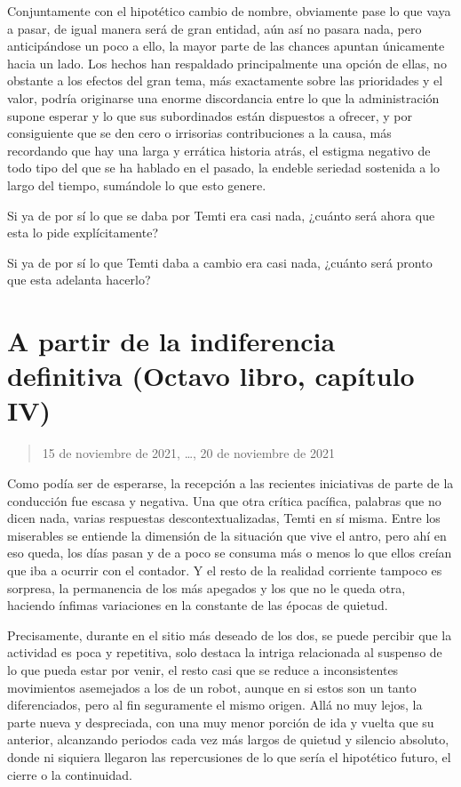 \documentclass[
]{book}
\begin{document}
Conjuntamente con el hipotético cambio de nombre, obviamente pase lo que vaya a pasar, de igual manera será de gran entidad, aún así no pasara nada, pero anticipándose un poco a ello, la mayor parte de las chances apuntan únicamente hacia un lado. Los hechos han respaldado principalmente una opción de ellas, no obstante a los efectos del gran tema, más exactamente sobre las prioridades y el valor, podría originarse una enorme discordancia entre lo que la administración supone esperar y lo que sus subordinados están dispuestos a ofrecer, y por consiguiente que se den cero o irrisorias contribuciones a la causa, más recordando que hay una larga y errática historia atrás, el estigma negativo de todo tipo del que se ha hablado en el pasado, la endeble seriedad sostenida a lo largo del tiempo, sumándole lo que esto genere.

Si ya de por sí lo que se daba por Temti era casi nada, ¿cuánto será ahora que esta lo pide explícitamente?

Si ya de por sí lo que Temti daba a cambio era casi nada, ¿cuánto será pronto que esta adelanta hacerlo?

\hypertarget{a-partir-de-la-indiferencia-definitiva-octavo-libro-capuxedtulo-iv}{%
\section{A partir de la indiferencia definitiva (Octavo libro, capítulo IV)}\label{a-partir-de-la-indiferencia-definitiva-octavo-libro-capuxedtulo-iv}}

\begin{quote}
15 de noviembre de 2021, \ldots, 20 de noviembre de 2021
\end{quote}

Como podía ser de esperarse, la recepción a las recientes iniciativas de parte de la conducción fue escasa y negativa. Una que otra crítica pacífica, palabras que no dicen nada, varias respuestas descontextualizadas, Temti en sí misma. Entre los miserables se entiende la dimensión de la situación que vive el antro, pero ahí en eso queda, los días pasan y de a poco se consuma más o menos lo que ellos creían que iba a ocurrir con el contador. Y el resto de la realidad corriente tampoco es sorpresa, la permanencia de los más apegados y los que no le queda otra, haciendo ínfimas variaciones en la constante de las épocas de quietud.

Precisamente, durante en el sitio más deseado de los dos, se puede percibir que la actividad es poca y repetitiva, solo destaca la intriga relacionada al suspenso de lo que pueda estar por venir, el resto casi que se reduce a inconsistentes movimientos asemejados a los de un robot, aunque en si estos son un tanto diferenciados, pero al fin seguramente el mismo origen. Allá no muy lejos, la parte nueva y despreciada, con una muy menor porción de ida y vuelta que su anterior, alcanzando periodos cada vez más largos de quietud y silencio absoluto, donde ni siquiera llegaron las repercusiones de lo que sería el hipotético futuro, el cierre o la continuidad.
\end{document}
